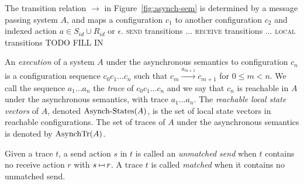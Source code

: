 The transition relation $\rightarrow$ in Figure~\ref{fig:asynch-sem} is determined by a message passing system $A$, and maps
a configuration $c_1$ to another configuration $c_2$ and indexed action $a\in S_{id}\cup R_{id}$ or $\epsilon$.
\textsc{send} transitions ... \textsc{receive} transitions ... \textsc{local} transitions TODO FILL IN

An \emph{execution} of a system $A$ under the asynchronous semantics to configuration ${c}_n$
is a configuration sequence ${c}_0 {c}_1 \ldots {c}_n$ such that
$  {c}_m \xrightarrow{a_{m+1}} {c}_{m+1}$
for $0 \le m < n$. We call
the sequence $a_1 \ldots a_n$ the \emph{trace} of ${c}_0 {c}_1 \ldots
{c}_n$ and we say that ${c}_n$ is reachable in $A$ under the asynchronous semantics, with trace $a_1\ldots a_n$. The \emph{reachable local state vectors} of $A$, denoted $\mathrm{Asynch}\text{-}\mathrm{States}(A)$, is the
set of local state vectors in reachable configurations.
%
The set of traces of $A$ under the asynchronous semantics is denoted by $\mathrm{AsynchTr}({A})$.

Given a trace $t$, a send action $s$ in $t$ is called an \emph{unmatched send} when $t$ contains no receive action $r$ with $s\match r$. A trace $t$ is called \emph{matched} when it contains no unmatched send.




